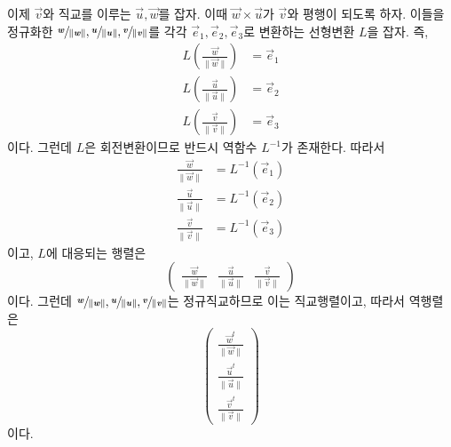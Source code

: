 \documentclass[../engineering_mathematics_lecture_note.tex]{subfiles}
\begin{document}
\begin{remark}
    이제 $\vec v$와 직교를 이루는 $\vec u, \vec w$를 잡자.
    이때 $\vec w \times \vec u$가 $\vec v$와 평행이 되도록 하자.
    이들을 정규화한 $\sfrac{\bm{\mathit{w}}}{\lVert \bm{\mathit{w}} \rVert}, \sfrac{\bm{\mathit{u}}}{\lVert \bm{\mathit{u}} \rVert}, \sfrac{\bm{\mathit{v}}}{\lVert \bm{\mathit{v}} \rVert}$를 각각 $\vec e_1, \vec e_2, \vec e_3$로 변환하는 선형변환 $L$을 잡자.
    즉,
    \begin{align*}
        L\left(\frac{\vec w}{\lVert \vec w \rVert}\right) &= \vec e_1\\
        L\left(\frac{\vec u}{\lVert \vec u \rVert}\right) &= \vec e_2\\
        L\left(\frac{\vec v}{\lVert \vec v \rVert}\right) &= \vec e_3
    \end{align*}
    이다.
    그런데 $L$은 회전변환이므로 반드시 역함수 $L^{-1}$가 존재한다.
    따라서
    \begin{align*}
        \frac{\vec w}{\lVert \vec w \rVert} &= L^{-1}(\vec e_1)\\
        \frac{\vec u}{\lVert \vec u \rVert} &= L^{-1}(\vec e_2)\\
        \frac{\vec v}{\lVert \vec v \rVert} &= L^{-1}(\vec e_3)
    \end{align*}
    이고, $L$에 대응되는 행렬은 
    \begin{equation*}
        \begin{pmatrix}
            \frac{\vec w}{\lVert \vec w \rVert} & \frac{\vec u}{\lVert \vec u \rVert} & \frac{\vec v}{\lVert \vec v \rVert}
        \end{pmatrix}
    \end{equation*}
    이다.
    그런데 $\sfrac{\bm{\mathit{w}}}{\lVert \bm{\mathit{w}} \rVert}, \sfrac{\bm{\mathit{u}}}{\lVert \bm{\mathit{u}} \rVert}, \sfrac{\bm{\mathit{v}}}{\lVert \bm{\mathit{v}} \rVert}$는 정규직교하므로 이는 직교행렬이고, 따라서 역행렬은
    \begin{equation*}
        \begin{pmatrix}
            \frac{\vec w^t}{\lVert \vec w \rVert} \\ \frac{\vec u^t}{\lVert \vec u \rVert} \\ \frac{\vec v^t}{\lVert \vec v \rVert}
        \end{pmatrix}
    \end{equation*}
    이다.


\end{remark}
\end{document}
